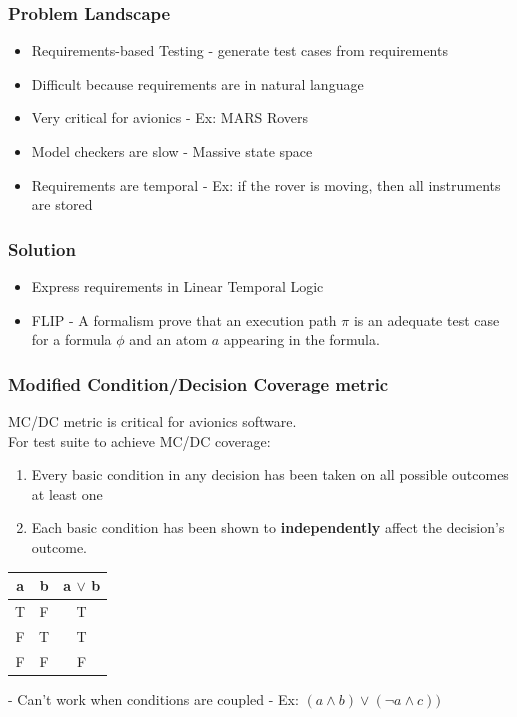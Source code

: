 \documentclass[compress,red]{beamer}
\begin{document}
\frame
{
	\frametitle{Problem Landscape}
	\begin{itemize}
		\pause
		\item Requirements-based Testing - generate test cases from requirements
		\pause
		\item Difficult because requirements are in natural language
		\pause
		\item Very critical for avionics - Ex: MARS Rovers 
		\pause
		\item Model checkers are slow - Massive state space
		\pause
		\item Requirements are temporal - Ex: if the rover is moving, then all instruments are stored
	\end{itemize}
}

\frame
{
	\frametitle{Solution}
	\begin{itemize}
		\pause
		\item Express requirements in Linear Temporal Logic 
		\pause
		\item FLIP - A formalism prove that an execution path $\pi$ is an adequate test case for a formula $\phi$ and an atom $a$ appearing in the formula. 
	\end{itemize}
}

\frame
{
	\frametitle{Modified Condition/Decision Coverage metric}
	\pause
	MC/DC metric is critical for avionics software. \\
	\pause
	For test suite to achieve MC/DC coverage:
	\pause
	\begin{enumerate}
		\item Every basic condition in any decision has been taken on all possible outcomes at least one
		\item Each basic condition has been shown to \textbf{independently} affect the decision's outcome.
	\end{enumerate}

	\pause
	\begin{center}
	\begin{tabular}{|c c|c|}
	\hline
		a & b & a $\lor$ b \\ \hline
		T & F & T \\ \hline
		F & T & T \\ \hline
		F & F & F \\ \hline
	\end{tabular}
	\end{center}

	- Can't work when conditions are coupled - Ex: $(a \land b) \lor (\lnot a \land c))$
}
\end{document}
